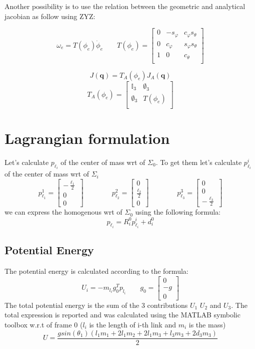 \documentclass[a4paper,12pt]{article}
\renewcommand*{\l}{\ell}
\newcommand*{\I}{\mathbb{I}}
\newcommand*{\q}{\bm{q}}
\begin{document}
\noindent Another possibility is to use the relation between the geometric and analytical jacobian as follow using ZYZ:

\[
\omega_e = T(\phi_e)\dot{\phi}_e
\qquad
T(\phi_e) = \begin{bmatrix}
    0 & -s_\varphi & c_\varphi s_\theta \\
    0 &  c_\varphi & s_\varphi s_\theta \\
    1 &          0 &           c_\theta \\
\end{bmatrix}
\]

\[
J(\q) = T_A(\phi_e) J_A(\q)
\]
\[
T_A(\phi_e) = \begin{bmatrix}
    \I_3 & \emptyset_3 \\ 
\emptyset_3 &     T(\phi_e) \\
\end{bmatrix}
\]

\section{Lagrangian formulation}
Let's calculate $p_{\l_i}$ of the center of mass wrt of $\Sigma_0$. To get them let's calculate $p^i_{\l_i}$ of the center of mass wrt of $\Sigma_i$
\[
p_{\l_1}^{1} = \begin{bmatrix}  - \frac{\l_1}{2} \\ 0 \\ 0 \end{bmatrix}
\qquad
\qquad
p_{\l_2}^{2} = \begin{bmatrix} 0 \\ \frac{\l_2}{2} \\ 0 \end{bmatrix}
\qquad
\qquad
p_{\l_3}^{3} = \begin{bmatrix} 0 \\ 0 \\  - \frac{\l_3}{2} \end{bmatrix}
\]
we can express the homogenous wrt of $\Sigma_0$ using the following formula: 
\[
p_{\l_i} = R^0_i p_{\l_i}^{i}  +  d^0_i
\] 

\subsection{Potential Energy}
The potential energy is calculated according to the formula:
\[
    U_i = -m_{l_i}g_0^{T}p_{l_i}
    \qquad
    g_0 = \begin{bmatrix}
        0\\ -g \\ 0
    \end{bmatrix}
\]
\noindent The total potential energy is the sum of the 3 contributions $U_1$ $U_2$ and $U_3$. The total expression is reported and was calculated using the MATLAB symbolic toolbox w.r.t of frame 0 ($l_{i}$ is the length of i-th link and $m_i$ is the mass)
\[
    U = \frac{gsin(\theta_1)(l_{1}m_1 + 2l_{1}m_2 + 2l_{1}m_3 + l_{3}m_3 + 2d_3m_3)}{2}  
\]
\end{document}
